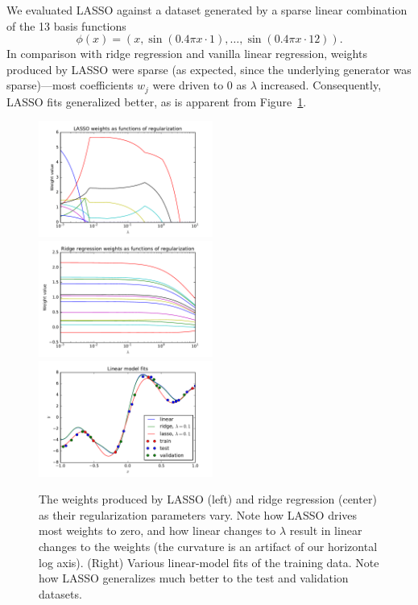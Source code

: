 \documentclass{article}
\begin{document}
\begin{multicols}{2}
We evaluated LASSO against a dataset generated by a sparse linear combination of the 13 basis functions
\begin{equation}
\phi(x)=(x, \sin{(0.4\pi x\cdot1)},\dots,\sin({0.4\pi x\cdot 12})).
\end{equation}
In comparison with ridge regression and vanilla linear regression, weights produced by LASSO were sparse (as expected, since the underlying generator was sparse)---most coefficients $w_j$ were driven to 0 as $\lambda$ increased.
Consequently, LASSO fits generalized better, as is apparent from Figure~\ref{fig:lasso-weights}.

\begin{figure}
   \centering
   \includegraphics[width=2.25in]{img/4-1-lasso-weights.pdf}
   \includegraphics[width=2.25in]{img/4-1-ridge-weights.pdf}
   \includegraphics[width=2.25in]{img/4-1-fits.pdf}
   \caption{The weights produced by LASSO (left) and ridge regression (center) as their regularization parameters vary. Note how LASSO drives most weights to zero, and how linear changes to $\lambda$ result in linear changes to the weights (the curvature is an artifact of our horizontal log axis). (Right) Various linear-model fits of the training data. Note how LASSO generalizes much better to the test and validation datasets.}
   \label{fig:lasso-weights}
\end{figure}




\end{multicols}
\end{document}
